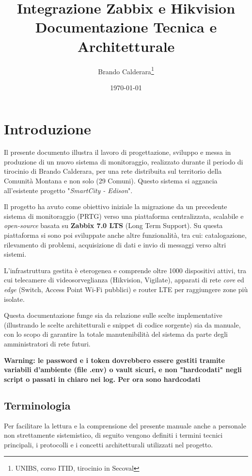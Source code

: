 \documentclass[12pt, a4paper]{report}
\title{\textbf{Integrazione Zabbix e Hikvision}\\ \large Documentazione Tecnica e Architetturale}
\author{Brando Calderara\thanks{UNIBS, corso ITID, tirocinio in Secoval}}
\date{\today}
\begin{document}
\maketitle

\tableofcontents
\newpage

\chapter{Introduzione}

Il presente documento illustra il lavoro di progettazione, 
sviluppo e messa in produzione di un nuovo sistema di monitoraggio, 
realizzato durante il periodo di tirocinio di Brando Calderara, per una rete distribuita sul territorio della
Comunità Montana e non solo (29 Comuni). 
Questo sistema si aggancia all'esistente progetto "\emph{SmartCity - Edison}".

Il progetto ha avuto come obiettivo iniziale la migrazione da un precedente sistema di 
monitoraggio (PRTG) 
verso una piattaforma centralizzata, scalabile e \textit{open-source} 
basata su \textbf{Zabbix 7.0 LTS} (Long Term Support). 
Su questa piattaforma si sono poi sviluppate anche altre funzionalità, tra cui: catalogazione,
rilevamento di problemi, acquisizione di dati e invio di messaggi verso altri sistemi.

L'infrastruttura gestita è eterogenea e comprende oltre 1000 dispositivi attivi, 
tra cui telecamere di videosorveglianza (Hikvision, Vigilate), apparati di rete \textit{core} ed 
\textit{edge} (Switch, Access Point Wi-Fi pubblici) e router LTE per raggiungere zone più isolate.

Questa documentazione funge sia da relazione sulle scelte implementative 
(illustrando le scelte architetturali e snippet di codice sorgente) 
sia da manuale, con lo scopo di garantire la totale manutenibilità del sistema 
da parte degli amministratori di rete futuri.

\textbf{Warning: le password e i token dovrebbero essere gestiti tramite variabili d'ambiente (file .env)
 o vault sicuri, e non "hardcodati" negli script o passati in chiaro nei log. Per ora sono hardcodati}

\section{Terminologia}
Per facilitare la lettura e la comprensione del presente manuale anche a personale non strettamente sistemistico, di seguito vengono definiti i termini tecnici principali, i protocolli e i concetti architetturali utilizzati nel progetto.
\end{document}

